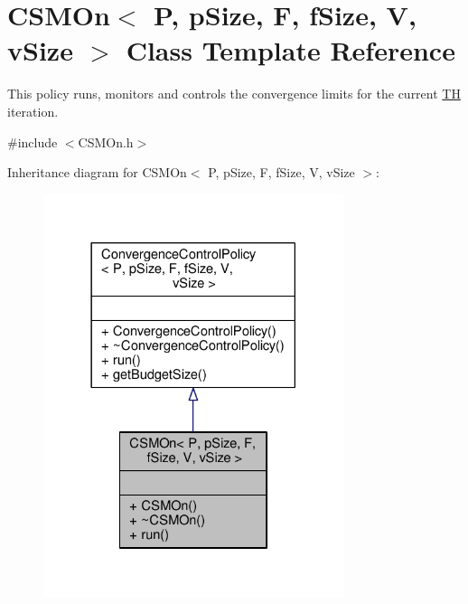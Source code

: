 \hypertarget{classCSMOn}{}\section{C\+S\+M\+On$<$ P, p\+Size, F, f\+Size, V, v\+Size $>$ Class Template Reference}
\label{classCSMOn}


This policy runs, monitors and controls the convergence limits for the current \hyperlink{classTH}{TH} iteration.  




{\ttfamily \#include $<$C\+S\+M\+On.\+h$>$}



Inheritance diagram for C\+S\+M\+On$<$ P, p\+Size, F, f\+Size, V, v\+Size $>$\+:\nopagebreak
\begin{figure}[H]
\begin{center}
\leavevmode
\includegraphics[width=249pt]{classCSMOn__inherit__graph}
\end{center}
\end{figure}


